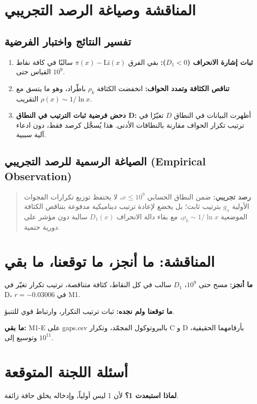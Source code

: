 \documentclass[12pt,a4paper]{article}
\begin{document}
\section{المناقشة وصياغة الرصد التجريبي}
\subsection{تفسير النتائج واختبار الفرضية}
\begin{enumerate}
\item \textbf{ثبات إشارة الانحراف ($D_1 < 0$):} بقي الفرق $\pi(x) - \mathrm{Li}(x)$ سالبًا في كافة نقاط القياس حتى $10^9$.
\item \textbf{تناقص الكثافة وتمدد الحواف:} انخفضت الكثافة $\rho_k$ باطّراد، وهو ما يتسق مع التقريب $\rho(x) \sim 1/\ln x$.
\item \textbf{دحض فرضية ثبات الترتيب في النطاق \textenglish{D}:} أظهرت البيانات في النطاق $D$ تغيّرًا في ترتيب تكرار الحواف مقارنة بالنطاقات الأدنى. هذا يُسجَّل كرصد فقط، دون ادعاء آلية سببية.
\end{enumerate}

\subsection{الصياغة الرسمية للرصد التجريبي (\textenglish{Empirical Observation})}
\begin{quote}
\textbf{رصد تجريبي:} ضمن النطاق الحسابي $x \leq 10^9$، لا يحتفظ توزيع تكرارات الفجوات الأولية $g_n$ بترتيب ثابت؛ بل يخضع لإعادة ترتيب ديناميكية مدفوعة بتناقص الكثافة الموضعية $\rho_k \sim 1/\ln x$، مع بقاء دالة الانحراف $D_1(x)$ سالبة دون مؤشر على دورية حتمية.
\end{quote}

\section{المناقشة: ما أنجز، ما توقعنا، ما بقي}
\textbf{ما أنجز:} مسح حتى $10^9$، $D_1$ سالب في كل النقاط، كثافة متناقصة، ترتيب تكرار تغيّر في D، $r=-0.03006$ في M1.

\textbf{ما توقعنا ولم نجده:} ثبات ترتيب التكرار، وارتباط قوي للتنبؤ.

\textbf{ما بقي:} M1-E على \textenglish{gaps.csv} بالبروتوكول المجمّد، وتكرار C و D بأرقامهما الحقيقية، وتوسيع إلى $10^{11}$.

\section{أسئلة اللجنة المتوقعة}
\textbf{لماذا استبعدت 1؟} لأن 1 ليس أولياً، وإدخاله يخلق حافة زائفة.
\end{document}
